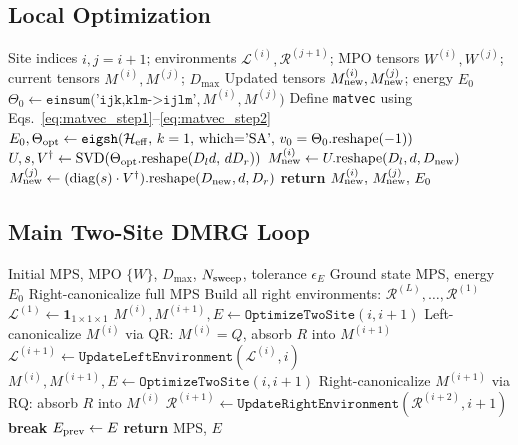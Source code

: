 \documentclass[aps,prb,onecolumn,scriptaddress]{revtex4-2}
\newcommand{\eps}{\epsilon}
\begin{document}
	\subsection{Local Optimization}
	
	\begin{algorithm}[H]
		\caption{OptimizeTwoSite}
		\begin{algorithmic}[1]
			\Require Site indices $i, j=i+1$; environments
			$\mathcal{L}^{(i)}, \mathcal{R}^{(j+1)}$;
			MPO tensors $W^{(i)}, W^{(j)}$;
			current tensors $M^{(i)}, M^{(j)}$; $D_{\max}$
			\Ensure Updated tensors $M^{(i)}_{\rm new}, M^{(j)}_{\rm new}$; energy $E_0$
			\State $\Theta_0 \gets \texttt{einsum('ijk,klm->ijlm',}\, M^{(i)}, M^{(j)}\texttt{)}$
			\State Define \texttt{matvec} using Eqs.~\eqref{eq:matvec_step1}--\eqref{eq:matvec_step2}
			\State $E_0, \Theta_{\rm opt} \gets
			\texttt{eigsh}(\mathcal{H}_{\rm eff},\, k=1,\, \text{which='SA'},\,
			v_0=\Theta_0.\text{reshape}(-1))$
			\State $U, s, V^\dagger \gets \text{SVD}(\Theta_{\rm opt}.\text{reshape}(D_l d,\, d D_r))$
			\State $M^{(i)}_{\rm new} \gets U.\text{reshape}(D_l, d, D_{\rm new})$
			\State $M^{(j)}_{\rm new} \gets (\text{diag}(s)\cdot V^\dagger).\text{reshape}(D_{\rm new}, d, D_r)$
			\State \textbf{return} $M^{(i)}_{\rm new},\, M^{(j)}_{\rm new},\, E_0$
		\end{algorithmic}
	\end{algorithm}
	
	\subsection{Main Two-Site DMRG Loop}
	
	\begin{algorithm}[H]
		\caption{DMRG\_TwoSite}
		\begin{algorithmic}[1]
			\Require Initial MPS, MPO $\{W\}$, $D_{\max}$, $N_{\rm sweep}$, tolerance $\eps_E$
			\Ensure Ground state MPS, energy $E_0$
			\State Right-canonicalize full MPS
			\State Build all right environments: $\mathcal{R}^{(L)}, \dots, \mathcal{R}^{(1)}$
			\State $\mathcal{L}^{(1)} \gets \mathbf{1}_{1\times1\times1}$
			\State {}
			\State $M^{(i)}, M^{(i+1)}, E \gets \texttt{OptimizeTwoSite}(i, i+1)$
			\State Left-canonicalize $M^{(i)}$ via QR: $M^{(i)} = Q$, absorb $R$ into $M^{(i+1)}$
			\State $\mathcal{L}^{(i+1)} \gets \texttt{UpdateLeftEnvironment}(\mathcal{L}^{(i)}, i)$
			\EndFor
			\State {}
			\State $M^{(i)}, M^{(i+1)}, E \gets \texttt{OptimizeTwoSite}(i, i+1)$
			\State Right-canonicalize $M^{(i+1)}$ via RQ: absorb $R$ into $M^{(i)}$
			\State $\mathcal{R}^{(i+1)} \gets \texttt{UpdateRightEnvironment}(\mathcal{R}^{(i+2)}, i+1)$
			\EndFor
			\If{$|E - E_{\rm prev}| < \eps_E$ \textbf{and} sweep $\geq 3$}
			\State \textbf{break} 
			\EndIf
			\State $E_{\rm prev} \gets E$
			\EndFor
			\State \textbf{return} MPS, $E$
		\end{algorithmic}
	\end{algorithm}
	
\end{document}

